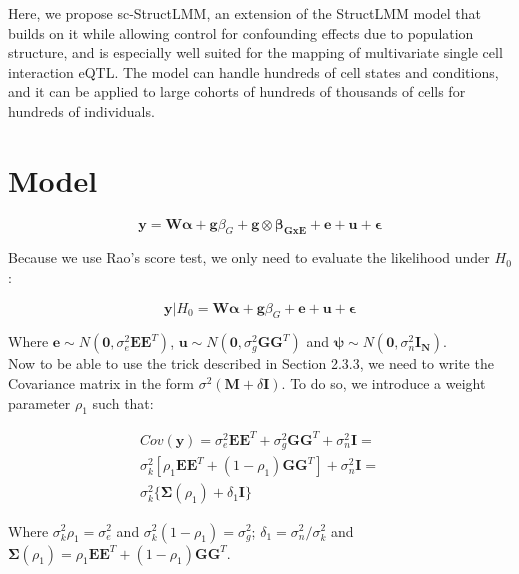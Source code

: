 Here, we propose sc-StructLMM, an extension of the StructLMM model that builds on it while allowing control for confounding effects due to population structure, and is especially well suited for the mapping of multivariate single cell interaction eQTL. 
The model can handle hundreds of cell states and conditions, and it can be applied to large cohorts of hundreds of thousands of cells for hundreds of  individuals.


\section{Model} 

\begin{equation}\label{eq:scStructLMM}
 \mathbf{y} =  \mathbf{W}\boldsymbol{\alpha} + \mathbf{g}\beta_G + \mathbf{g} \otimes \boldsymbol{\beta_{GxE}} + \mathbf{e} + \mathbf{u} + \boldsymbol{\epsilon} 
\end{equation}

Because we use Rao's score test, we only need to evaluate the likelihood under $H_0$:

\begin{equation}
 \mathbf{y}|H_0 =  \mathbf{W}\boldsymbol{\alpha} + \mathbf{g}\beta_G + \mathbf{e} + \mathbf{u} + \boldsymbol{\epsilon} 
\end{equation}

Where $\mathbf{e} \sim N(\mathbf{0},\sigma_e^2 \mathbf{E}\mathbf{E}^T)$, $\mathbf{u} \sim N(\mathbf{0},\sigma_g^2 \mathbf{G}\mathbf{G}^T)$ and $\boldsymbol{\psi} \sim N(\mathbf{0},\sigma_n^2 \mathbf{I_N})$.\\

Now to be able to use the trick described in Section 2.3.3, we need to write the Covariance matrix in the form $\sigma^2(\mathbf{M}+\delta\mathbf{I})$.
To do so, we introduce a weight parameter $\rho_1$ such that:

\begin{equation}
\begin{split}
    Cov(\mathbf{y}) = \sigma_e^2 \mathbf{E}\mathbf{E}^T + \sigma_g^2 \mathbf{G}\mathbf{G}^T+ \sigma_n^2 \mathbf{I} =\\
    \sigma_k^2[\rho_1\mathbf{E}\mathbf{E}^T + (1-\rho_1) \mathbf{G}\mathbf{G}^T] + \sigma_n^2 \mathbf{I} =\\ \sigma_k^2\{\boldsymbol{\Sigma}(\rho_1) + \delta_1 \mathbf{I}\}
\end{split}
\end{equation}

Where $\sigma_k^2\rho_1 = \sigma_e^2$ and $\sigma_k^2(1-\rho_1) = \sigma_g^2$;
$\delta_1 = \sigma_n^2/\sigma_k^2$ and $\boldsymbol{\Sigma}(\rho_1) = \rho_1\mathbf{E}\mathbf{E}^T + (1-\rho_1) \mathbf{G}\mathbf{G}^T$.\\

